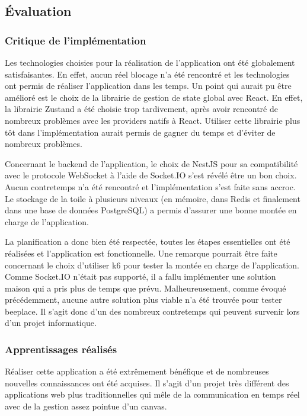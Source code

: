 \subsection{Évaluation}


\subsubsection{Critique de l'implémentation}

Les technologies choisies pour la réalisation de l'application ont été globalement satisfaisantes. En effet, aucun réel blocage n'a été rencontré et les technologies ont permis de réaliser l'application dans les temps. Un point qui aurait pu être amélioré est le choix de la librairie de gestion de state global avec React. En effet, la librairie Zustand a été choisie trop tardivement, après avoir rencontré de nombreux problèmes avec les providers natifs à React. Utiliser cette librairie plus tôt dans l'implémentation aurait permis de gagner du temps et d'éviter de nombreux problèmes.

Concernant le backend de l'application, le choix de NestJS pour sa compatibilité avec le protocole WebSocket à l'aide de Socket.IO s'est révélé être un bon choix. Aucun contretemps n'a été rencontré et l'implémentation s'est faite sans accroc. Le stockage de la toile à plusieurs niveaux (en mémoire, dans Redis et finalement dans une base de données PostgreSQL) a permis d'assurer une bonne montée en charge de l'application.

La planification a donc bien été respectée, toutes les étapes essentielles ont été réalisées et l'application est fonctionnelle. Une remarque pourrait être faite concernant le choix d'utiliser k6 pour tester la montée en charge de l'application. Comme Socket.IO n'était pas supporté, il a fallu implémenter une solution maison qui a pris plus de temps que prévu. Malheureusement, comme évoqué précédemment, aucune autre solution plus viable n'a été trouvée pour tester \gls{beeplace}. Il s'agit donc d'un des nombreux contretemps qui peuvent survenir lors d'un projet informatique.

\subsubsection{Apprentissages réalisés}

Réaliser cette application a été extrêmement bénéfique et de nombreuses nouvelles connaissances ont été acquises. Il s'agit d'un projet très différent des applications web plus traditionnelles qui mêle de la communication en temps réel avec de la gestion assez pointue d'un canvas.

